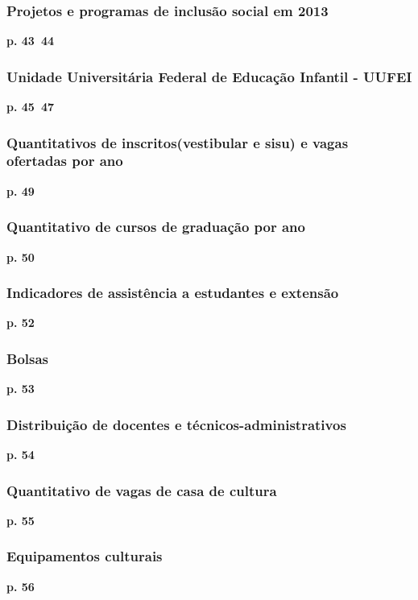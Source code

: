 \documentclass{article}
\begin{document}
\subsubsection*{Projetos e programas de inclusão social em 2013}
\textbf{p. 43~44}

\subsubsection*{Unidade Universitária Federal de Educação Infantil - UUFEI}
\textbf{p. 45~47}

\subsubsection*{Quantitativos de inscritos(vestibular e sisu) e vagas ofertadas por ano}
\textbf{p. 49}

\subsubsection*{Quantitativo de cursos de graduação por ano}
\textbf{p. 50}

\subsubsection*{Indicadores de assistência a estudantes e extensão}
\textbf{p. 52}

\subsubsection*{Bolsas}
\textbf{p. 53}

\subsubsection*{Distribuição de docentes e técnicos-administrativos}
\textbf{p. 54}

\subsubsection*{Quantitativo de vagas de casa de cultura}
\textbf{p. 55}

\subsubsection*{Equipamentos culturais}
\textbf{p. 56}
\end{document}
